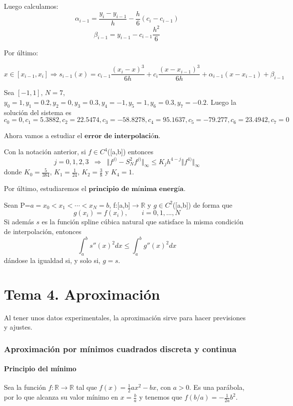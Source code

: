 Luego calculamos:
\[ \alpha _{i-1} = \frac{y_i - y_{i-1}}{h} - \frac{h}{6} (c_i-c_{i-1}) \]
\[ \beta _{i-1} = y_{i-1} - c_{i-1} \frac{h^2}{6} \]

Por último:

\[ x \in \left[ x_{i-1},x_i \right] \Rightarrow s_{i-1}(x) = c_{i-1} \frac{(x_i-x)^3}{6h}+c_i \frac{(x-x_{i-1})^3}{6h} + \alpha _{i-1} (x-x_{i-1}) + \beta _{i-1} \]

\begin{ejemplo}
Sea $\left[ -1,1 \right]$, $N=7$, $y_0=1, y_1=0.2, y_2=0, y_3=0.3, y_4=-1, y_5=1, y_6=0.3, y_7=-0.2$. Luego la solución del sistema es
\[ c_0=0, c_1=5.3882, c_2=22.5474, c_3=-58.8278, c_4=95.1637, c_5=-79.277, c_6 = 23.4942, c_7=0 \]

Ahora vamos a estudiar el $\textbf{error de interpolación}$.
\end{ejemplo}

\begin{nprop}
Con la notación anterior, si $f \in C^4$([a,b]) entonces
\[ j=0,1,2,3 \; \; \Rightarrow \; \; \Vert f^{j)} - S_N^2f^{j)} \Vert _\infty \leq K_jh^{4-j} \Vert f^{4)} \Vert _\infty \]
donde $K_0=\frac{5}{384}$, $K_1 = \frac{1}{24}$, $K_2 = \frac{3}{8}$ y $K_4 = 1$.
\end{nprop}

Por último, estudiaremos el $\textbf{principio de mínima energía}$.

\begin{nprop}
Sean P={$a=x_0 < x_1 < \cdots < x_N = b$}, f:[a,b]$\longrightarrow \mathbb{R}$ y $g \in C^2$([a,b]) de forma que
\[ g(x_i) = f(x_i), \qquad i =0,1,...,N \]
Si además $s$ es la función spline cúbica natural que satisface la misma condición de interpolación, entonces
\[ \int_a^b s''(x)^2dx \leq \int_a^b g''(x)^2 dx \]
dándose la igualdad si, y solo si, $g = s$.
\end{nprop}

\pagebreak

\part{Tema 4. Aproximación}
Al tener unos datos experimentales, la aproximación sirve para hacer previsiones y ajustes.

\section{Aproximación por mínimos cuadrados discreta y continua}

\subsection{Principio del mínimo}
Sea la función $f: \mathbb{R} \longrightarrow \mathbb{R}$ tal que $f(x)=\frac{1}{2}ax^2-bx$, con $a > 0$. Es una parábola, por lo que alcanza su valor mínimo en $x = \frac{b}{a}$ y tenemos que $f(b/a) = - \frac{1}{2a}b^2$.

